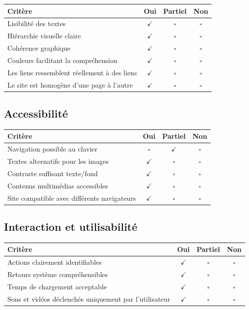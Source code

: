 \documentclass[11pt,a4paper]{article}
\begin{document}
\begin{longtable}{|p{9cm}|c|c|c|}
\hline
\textbf{Critère} & \textbf{Oui} & \textbf{Partiel} & \textbf{Non} \\ \hline
\endhead
Lisibilité des textes & $\checkmark$ & $\square$ & $\square$ \\ \hline
Hiérarchie visuelle claire & $\checkmark$ & $\square$ & $\square$ \\ \hline
Cohérence graphique & $\checkmark$ & $\square$ & $\square$ \\ \hline
Couleurs facilitant la compréhension & $\checkmark$ & $\square$ & $\square$ \\ \hline
Les liens ressemblent réellement à des liens & $\checkmark$ & $\square$ & $\square$ \\ \hline 
Le site est homogène d’une page à l’autre & $\checkmark$ & $\square$ & $\square$ \\ \hline
\end{longtable}

\subsection*{Accessibilité}

\begin{longtable}{|p{9cm}|c|c|c|}
\hline
\textbf{Critère} & \textbf{Oui} & \textbf{Partiel} & \textbf{Non} \\ \hline
\endhead
Navigation possible au clavier & $\square$ & $\checkmark$ & $\square$ \\ \hline
Textes alternatifs pour les images & $\checkmark$ & $\square$ & $\square$ \\ \hline
Contraste suffisant texte/fond & $\checkmark$ & $\square$ & $\square$ \\ \hline
Contenus multimédias accessibles & $\checkmark$ & $\square$ & $\square$ \\ \hline
Site compatible avec différents navigateurs & $\checkmark$ & $\square$ & $\square$ \\ \hline
\end{longtable}

\subsection*{Interaction et utilisabilité}

\begin{longtable}{|p{9cm}|c|c|c|}
\hline
\textbf{Critère} & \textbf{Oui} & \textbf{Partiel} & \textbf{Non} \\ \hline
\endhead
Actions clairement identifiables & $\checkmark$ & $\square$ & $\square$ \\ \hline
Retours système compréhensibles & $\checkmark$ & $\square$ & $\square$ \\ \hline
Temps de chargement acceptable & $\checkmark$ & $\square$ & $\square$ \\ \hline
Sons et vidéos déclenchés uniquement par l’utilisateur & $\checkmark$ & $\square$ & $\square$ \\ \hline
\end{longtable}
\end{document}
